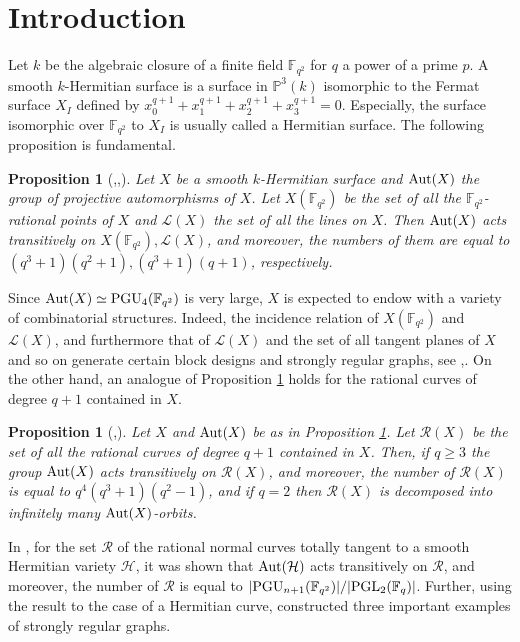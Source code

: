 \documentclass[11pt]{amsart}
\newcommand{\lt}{{}^\mathrm t\hspace{-0.5mm}}
\theoremstyle{plain} %
\newtheorem{prop}[thm]{Proposition} %
\theoremstyle{definition} %
\theoremstyle{remark} %
\begin{document}
\section{Introduction}
Let $k$ be the algebraic closure of a finite field $\mathbb{F}_{q^2}$ for $q$ a power of a prime $p$. A smooth $k$-Hermitian surface is a surface in $\mathbb{P}^3(k)$ isomorphic to the Fermat surface $X_I$ defined by $x_0^{q+1}+x_1^{q+1}+x_2^{q+1}+x_3^{q+1}=0$. Especially, the surface isomorphic over $\mathbb{F}_{q^2}$ to $X_I$ is usually called a Hermitian surface.
 The following proposition is fundamental.
 \begin{prop}[\cite{BC},\cite{C},\cite{Se}]\label{SS}
Let $X$ be a smooth $k$-Hermitian surface and ${\rm Aut}(X)$ the group of projective automorphisms of $X$. Let $X(\mathbb{F}_{q^2})$ be the set of all the $\mathbb{F}_{q^2}$-rational points of $X$ and $\mathcal{L}(X)$ the set of all the lines on $X$. Then ${\rm Aut}(X)$ acts transitively on $X(\mathbb{F}_{q^2}),\mathcal{L}(X)$, and moreover, the numbers
of them are equal to $(q^3+1)(q^2+1),(q^3+1)(q+1)$, respectively.
 \end{prop}
 Since ${\rm Aut}(X)\simeq{\rm PGU}_4(\mathbb{F}_{q^2})$ is very large, $X$ is expected to endow with a variety of combinatorial structures. Indeed, the incidence relation of $X(\mathbb{F}_{q^2})$ and $\mathcal{L}(X)$, and furthermore that of
$\mathcal{L}(X)$ and the set of all tangent planes of $X$ and so on generate certain block designs and strongly regular graphs, see \cite{BC},\cite{C}. On the other hand, an analogue of Proposition \ref{SS} holds for the rational curves of degree $q+1$ contained in $X$.
\begin{prop}[\cite{O},\cite{O2}]\label{O}
Let $X$ and ${\rm Aut}(X)$ be as in Proposition \ref{SS}. Let $\mathcal{R}(X)$ be the set of all the rational curves of degree $q+1$ contained in $X$. Then, if $q\ge3$ the group ${\rm Aut}(X)$ acts transitively on $\mathcal{R}(X)$, and moreover, the number of $\mathcal{R}(X)$ is equal to $q^4(q^3+1)(q^2-1)$, and if $q=2$ then $\mathcal{R}(X)$ is decomposed into infinitely many ${\rm Aut}(X)$-orbits.
\end{prop}
In \cite{Sh1}, for the set $\mathcal{R}$ of the rational normal curves totally tangent to a smooth Hermitian variety $\mathcal{H}$, it was shown that ${\rm Aut}(\mathcal{H})$ acts transitively on $\mathcal{R}$, and moreover, the number of $\mathcal{R}$ is equal to $|{\rm PGU}_{n+1}(\mathbb{F}_{q^2})|/|{\rm PGL}_2(\mathbb{F}_q)|$. Further, using the result to the case of a Hermitian curve, \cite{Sh2} constructed three important examples of strongly regular graphs.
\end{document}
